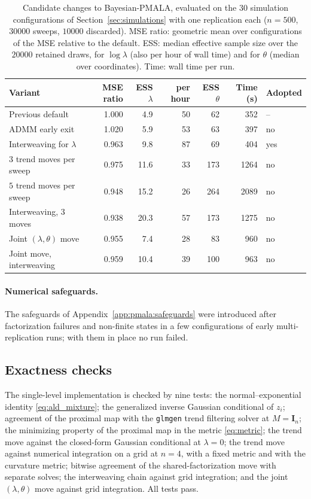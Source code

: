 \begin{table}[!htbp]
\centering
\small
\caption{Candidate changes to Bayesian-PMALA, evaluated on the $30$ simulation configurations of Section~\ref{sec:simulations} with one replication each ($n = 500$, $30000$ sweeps, $10000$ discarded). MSE ratio: geometric mean over configurations of the MSE relative to the default. ESS: median effective sample size over the $20000$ retained draws, for $\log\lambda$ (also per hour of wall time) and for $\theta$ (median over coordinates). Time: wall time per run.}
\label{tab:pmala_variants}
\setlength{\tabcolsep}{4pt}
\begin{tabular}{lrrrrrl}
\toprule
Variant & MSE ratio & ESS $\lambda$ & per hour & ESS $\theta$ & Time (s) & Adopted \\
\midrule
Previous default & 1.000 & 4.9 & 50 & 62 & 352 & -- \\
ADMM early exit & 1.020 & 5.9 & 53 & 63 & 397 & no \\
Interweaving for $\lambda$ & 0.963 & 9.8 & 87 & 69 & 404 & yes \\
$3$ trend moves per sweep & 0.975 & 11.6 & 33 & 173 & 1264 & no \\
$5$ trend moves per sweep & 0.948 & 15.2 & 26 & 264 & 2089 & no \\
Interweaving, $3$ moves & 0.938 & 20.3 & 57 & 173 & 1275 & no \\
Joint $(\lambda,\theta)$ move & 0.955 & 7.4 & 28 & 83 & 960 & no \\
Joint move, interweaving & 0.959 & 10.4 & 39 & 100 & 963 & no \\
\bottomrule
\end{tabular}
\end{table}

\paragraph{Numerical safeguards.} The safeguards of Appendix~\ref{app:pmala:safeguards} were introduced after factorization failures and non-finite states in a few configurations of early multi-replication runs; with them in place no run failed.


\subsection{Exactness checks}
\label{app:pmala:tests}

The single-level implementation is checked by nine tests: the normal--exponential identity \eqref{eq:ald_mixture}; the generalized inverse Gaussian conditional of $z_i$; agreement of the proximal map with the \texttt{glmgen} trend filtering solver \citep{tibshirani2014adaptive} at $M = \mathbf{I}_n$; the minimizing property of the proximal map in the metric \eqref{eq:metric}; the trend move against the closed-form Gaussian conditional at $\lambda = 0$; the trend move against numerical integration on a grid at $n = 4$, with a fixed metric and with the curvature metric; bitwise agreement of the shared-factorization move with separate solves; the interweaving chain against grid integration; and the joint $(\lambda,\theta)$ move against grid integration. All tests pass.

